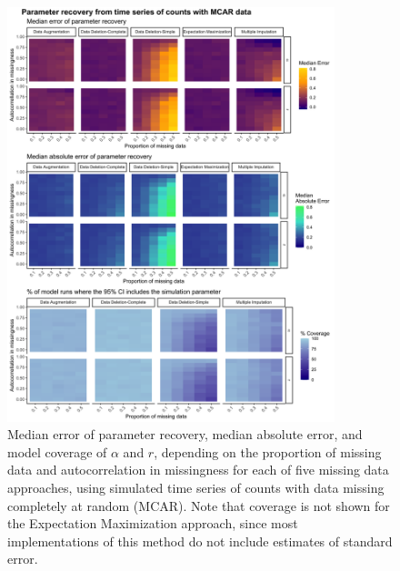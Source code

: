 \documentclass[12pt,english]{article} %
\begin{document}
  \begin{figure}
         \noindent\includegraphics[width = 0.85\textwidth]{Figures/MockedUpFigures/heatmap_PoissonMCAR_all.png}
     \caption{Median error of parameter recovery, median absolute error, and model coverage of $\alpha$ and $r$, depending on the proportion of missing data and autocorrelation in missingness for each of five missing data approaches, using simulated time series of counts with data missing completely at random (MCAR). Note that coverage is not shown for the Expectation Maximization approach, since most implementations of this method do not include estimates of standard error.}
     \label{fig:PoissonMCARheatmapALL}
 \end{figure}
 
\end{document}
